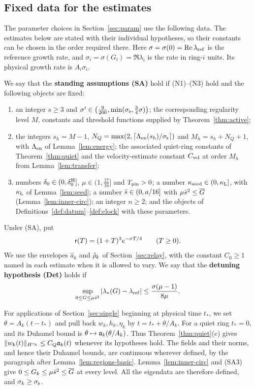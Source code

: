 \subsection{Fixed data for the estimates}
\label{sec:relay-data}

The parameter choices in Section~\ref{sec:param} use the following data.
The estimates below are stated with their individual hypotheses, so their
constants can be chosen in the order required there.
Here $\sigma=\sigma(0)=\Re\lambda_{\mathrm{ref}}$ is the reference growth rate, and
$\sigma_i=\sigma(G_i)=\Re\lambda_i$ is the rate in ring-$i$ units.
Its physical growth rate is $A_i\sigma_i$.

\begin{definition}
\label{def:standing}
We say that the \textbf{standing assumptions (SA)} hold if \textup{(N1)}--\textup{(N3)}
hold and the following objects are fixed:
\begin{enumerate}[label=\textup{(SA\arabic*)},leftmargin=*]
\item an integer $s\ge3$ and $\sigma'\in\big(\frac9{200},\min(\sigma_\flat,\frac34\sigma)\big)$;
  the corresponding regularity level $M$, constants and threshold functions
  supplied by Theorem~\ref{thm:active};
\item the integers $s_h=M-1$, $N_Q=\max(2,\lceil\Lambda_{\mathrm{en}}(s_h)/\sigma_\flat\rceil)$ and
  $M_h=s_h+N_Q+1$, with $\Lambda_{\mathrm{en}}$ of Lemma~\ref{lem:energy}; the associated
  quiet-ring constants of Theorem~\ref{thm:quiet} and the velocity-estimate
  constant $C_{\mathrm{vel}}$ at order $M_h$ from Lemma~\ref{lem:transfer};
\item numbers $\delta_0\in(0,\delta_0^{\mathrm{H}}]$, $\mu\in(1,\frac{17}{16}]$ and $T_{\mathrm{pin}}>0$; a
  number $\kappa_{\mathrm{seed}}\in(0,\kappa_{\mathrm{L}}]$, with $\kappa_{\mathrm{L}}$ of Lemma~\ref{lem:seed}; a number
  $\bar s\in(0,a/16]$ with $\mu\bar s^2\le\overline{G}$
  (Lemma~\ref{lem:inner-circ}); an integer $n\ge2$; and the objects of
  Definitions~\ref{def:datum}--\ref{def:clock} with these parameters.
\end{enumerate}
Under (SA), put
\begin{equation}
\label{eq:relay-tail-weight}
\mathsf{r}(T)=(1+T)^3e^{-\sigma T/4}\qquad(T\ge0).
\end{equation}
We use the envelopes $\hat a_k$ and $\hat\rho_k$ of Section~\ref{sec:relay},
with the constant $C_0\ge1$ named in each estimate when it is allowed to vary.
We say that the
\textbf{detuning hypothesis (Det)} holds if
\begin{equation}
\label{eq:detuning-hypothesis}
\sup_{0\le G\le \mu\bar s^2}|\lambda_*(G)-\lambda_{\mathrm{ref}}|
\le\frac{\sigma(\mu-1)}{8\mu}.
\end{equation}
\end{definition}

For applications of Section~\ref{sec:single} beginning at physical time $t_*$,
we set $\theta=A_k(t-t_*)$ and pull back $w_k,h_k,\eta_k$ by
$t=t_*+\theta/A_k$. For a quiet ring $t_*=0$, and its Duhamel bound is
$\theta\mapsto\mathfrak{a}_k(\theta/A_k)$. Thus Theorem~\ref{thm:quiet}(c) gives
$\|w_k(t)\|_{H^{s_h}}\le C_Q\mathfrak{a}_k(t)$ whenever its hypotheses hold.
The fields and their norms, and hence their Duhamel bounds, are continuous
wherever defined, by the paragraph after Lemma~\ref{lem:regions-basic}.
Lemma~\ref{lem:inner-circ} and (SA3) give
$0\le G_k\le\mu\bar s^2\le\overline{G}$ at every level. All the eigendata are
therefore defined, and $\sigma_k\ge\sigma_\flat$.
